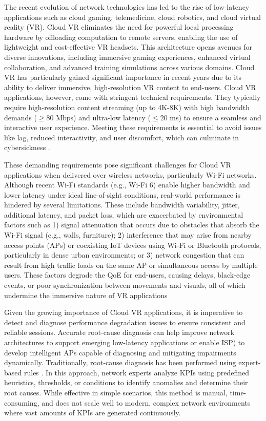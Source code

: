 The recent evolution of network technologies has led to the rise of low-latency applications such as cloud gaming, telemedicine, cloud robotics, and cloud virtual reality (VR). Cloud VR eliminates the need for powerful local processing hardware by offloading computation to remote servers, enabling the use of lightweight and cost-effective VR headsets. This architecture opens avenues for diverse innovations, including immersive gaming experiences, enhanced virtual collaboration, and advanced training simulations across various domains. Cloud VR has particularly gained significant importance in recent years \cite{nextmscVirtualReality} due to its ability to deliver immersive, high-resolution VR content to end-users. Cloud VR applications, however, come with stringent technical requirements. They typically require high-resolution content streaming (up to 4K-8K) with high bandwidth demands ($\geq 80$ Mbps) and ultra-low latency ($\leq 20$ ms) to ensure a seamless and interactive user experience. Meeting these requirements is essential to avoid issues like lag, reduced interactivity, and user discomfort, which can culminate in cybersickness \cite{huawei}.  

These demanding requirements pose significant challenges for Cloud VR applications when delivered over wireless networks, particularly Wi-Fi networks. Although recent Wi-Fi standards (e.g., Wi-Fi 6) enable higher bandwidth and lower latency under ideal line-of-sight conditions, real-world performance is hindered by several limitations. These include bandwidth variability, jitter, additional latency, and packet loss, which are exacerbated by environmental factors such as 1) signal attenuation that occurs due to obstacles that absorb the Wi-Fi signal (e.g., walls, furniture); 2) interference that may arise from nearby access points (APs) or coexisting IoT devices using Wi-Fi or Bluetooth protocols, particularly in dense urban environments; or 3) network congestion that can result from high traffic loads on the same AP or simultaneous access by multiple users. These factors degrade the \ac{QoE} for end-users, causing delays, black-edge events, or poor synchronization between movements and visuals, all of which undermine the immersive nature of VR applications \cite{li2020performance, lee2024adaptive, rossi2024subjective}

Given the growing importance of Cloud VR applications, it is imperative to detect and diagnose  performance degradation issues to ensure consistent and reliable sessions. Accurate root-cause diagnosis can help improve network architectures to support emerging low-latency applications or enable \ac{ISP}) to develop intelligent APs capable of diagnosing and mitigating impairments dynamically. Traditionally, root-cause diagnosis has been performed using expert-based rules \cite{hochenbaum2017automatic, chen2019matrix}. In this approach, network experts analyze \ac{KPIs} using predefined heuristics, thresholds, or conditions to identify anomalies and determine their root causes. While effective in simple scenarios, this method is manual, time-consuming, and does not scale well to modern, complex network environments where vast amounts of KPIs are generated continuously.  

